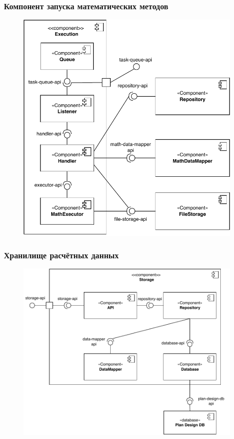 \begin{frame}
\frametitle{Компонент запуска математических методов}
\begin{figure}
    \includegraphics[scale=.5]{pictures/architecture/executor_component_detailed}
\end{figure}
\end{frame}

\begin{frame}
\frametitle{Хранилище расчётных данных}
\begin{figure}
    \includegraphics[scale=.55]{pictures/architecture/storage_component_common}
\end{figure}
\end{frame}


